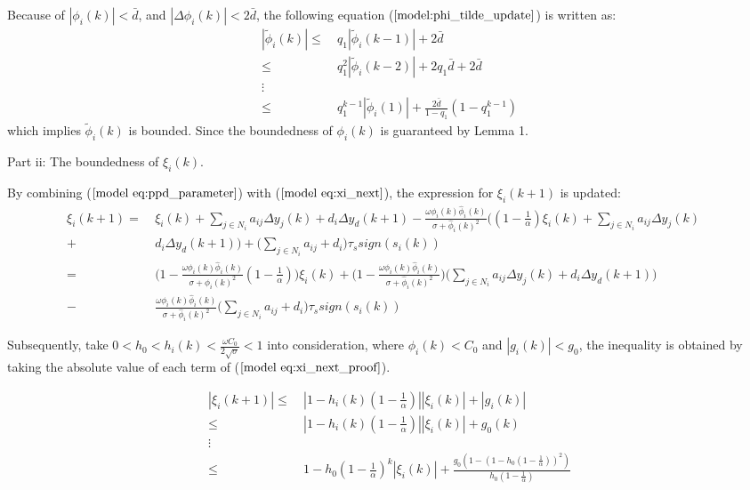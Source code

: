 \documentclass[journal,onecolumn]{IEEEtran}
\begin{document}
Because of $ |\phi_i(k)| < \bar{d} $, and $ |\Delta \phi_i(k)| < 2 \bar{d} $, the following equation ($ \ref{model:phi_tilde_update} $) is written as:
\begin{align}
    \label{model:absolute}
    |\tilde{\phi}_i(k)| \leq \ & q_1|\tilde{\phi}_i(k-1)| + 2 \bar{d} \quad \nonumber \\
    \leq \ & q_1^2|\tilde{\phi}_i(k-2)| + 2 q_1\bar{d} + 2\bar{d} \quad \nonumber \\
    \vdots \nonumber \\
    \leq \ & q_1^{k-1}|\tilde{\phi}_i(1)| + \frac{2 \bar{d}}{1-q_1}(1-q_1^{k-1})
\end{align} 
which implies $ \tilde{\phi}_i(k) $ is bounded. Since the boundedness of $ \phi_i(k) $ is guaranteed by Lemma 1. 
    
Part ii: The boundedness of $ \xi_i(k)$.

By combining ($ \ref{model eq:ppd_parameter} $) with ($ \ref{model eq:xi_next} $), the expression for \(\xi_i(k+1)\) is updated:
\begin{align}
    \label{model eq:xi_next_proof}
    \xi_i(k+1) = \ & \xi_i(k) + \sum_{j \in N_i}a_{ij} \Delta y_j(k) + d_i \Delta y_d(k+1) - \frac{\omega \phi_i(k) \hat{\phi}_i(k)}{\sigma + \hat{\phi}_i(k)^2} \bigg((1-\frac{1}{\alpha})\xi_i(k) + \sum_{j \in N_i}a_{ij} \Delta y_j(k) \quad \nonumber \\
    + \ & d_i \Delta y_d(k+1) \bigg) + \bigg( \sum_{j \in N_i}a_{ij} + d_i \bigg) \tau_s sign(s_i(k)) \nonumber \\
    = \ & \bigg( 1 - \frac{\omega \phi_i(k) \hat{\phi}_i(k)}{\sigma + \hat{\phi}_i(k)^2} (1-\frac{1}{\alpha}) \bigg) \xi_i(k) + \bigg( 1 - \frac{\omega \phi_i(k) \hat{\phi}_i(k)}{\sigma + \hat{\phi}_i(k)^2} \bigg) \bigg( \sum_{j \in N_i}a_{ij} \Delta y_j(k) + d_i \Delta y_d(k+1) \bigg) \quad \nonumber \\
    - \ & \frac{\omega \phi_i(k) \hat{\phi}_i(k)}{\sigma + \hat{\phi}_i(k)^2} \bigg( \sum_{j \in N_i}a_{ij} + d_i \bigg) \tau_s sign(s_i(k))
\end{align}

Subsequently, take $ 0<h_0<h_i(k)<\frac{\omega C_0}{2\sqrt{\sigma}}<1 $ into consideration, where $ \phi_i(k) < C_0 $ and $ |g_i(k)|<g_0 $, the inequality is obtained by taking the absolute value of each term of ($ \ref{model eq:xi_next_proof} $).

\begin{align}
    \label{model:absolute2}
    |\xi_i(k+1)| \leq \ & |1-h_i(k)(1-\frac{1}{ \alpha })| |\xi_i(k)| + |g_i(k)| \quad \nonumber \\
    \leq \ & |1-h_i(k)(1-\frac{1}{\alpha })| |\xi_i(k)| + g_0(k) \quad \nonumber \\
    \vdots \nonumber \\
    \leq \ & 1-h_0(1-\frac{1}{\alpha })^k |\xi_i(k)| + \frac{g_0(1-(1-h_0(1-\frac{1}{\alpha}))^2)}{h_0(1-\frac{1}{ \alpha})}
\end{align}
\end{document}
